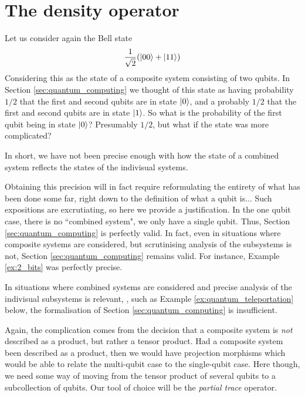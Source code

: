 \documentclass[12pt]{article}
\theoremstyle{plain}
\theoremstyle{definition}
\begin{document}
	\section{The density operator}\label{sec:density_operator}
	Let us consider again the Bell state
	\begin{equation}\label{eq:bell_again}
		\frac{1}{\sqrt{2}}(\ket{00} + \ket{11})
		\end{equation}
	Considering this as the state of a composite system consisting of two qubits. In Section \ref{sec:quantum_computing} we thought of this state as having probability $1/2$ that the first and second qubits are in state $\ket{0}$, and a probably $1/2$ that the first and second qubits are in state $\ket{1}$. So what is the probability of the first qubit being in state $\ket{0}$? Presumably $1/2$, but what if the state was more complicated?
	
	In short, we have not been precise enough with how the state of a combined system reflects the states of the indivisual systems.
	
	Obtaining this precision will in fact require reformulating the entirety of what has been done some far, right down to the definition of what a qubit is... Such expositions are excrutiating, so here we provide a justification. In the one qubit case, there is no ``combined system", we only have a single qubit. Thus, Section \ref{sec:quantum_computing} is perfectly valid. In fact, even in situations where composite systems are considered, but scrutinising analysis of the subsystems is not, Section \ref{sec:quantum_computing} remains valid. For instance, Example \ref{ex:2_bits} was perfectly precise.
	
	In situations where combined systems are considered and precise analysis of the indivisual subsystems is relevant, , such as Example \ref{ex:quantum_teleportation} below, the formalisation of Section \ref{sec:quantum_computing} is insufficient.
	
	Again, the complication comes from the decision that a composite system is \emph{not} described as a product, but rather a tensor product. Had a composite system been described as a product, then we would have projection morphisms which would be able to relate the multi-qubit case to the single-qubit case. Here though, we need some way of moving from the tensor product of several qubits to a subcollection of qubits. Our tool of choice will be the \emph{partial trace} operator.
	
\end{document}
